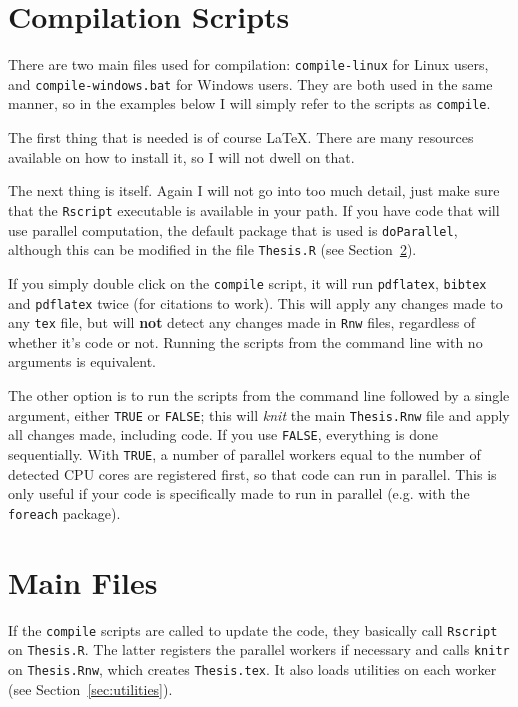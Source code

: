 \section{Compilation Scripts}
\label{sec:comp-scripts}

There are two main files used for compilation: \texttt{compile-linux} for Linux users, and \texttt{compile-windows.bat} for Windows users. They are both used in the same manner, so in the examples below I will simply refer to the scripts as \texttt{compile}.

The first thing that is needed is of course \LaTeX{}. There are many resources available on how to install it, so I will not dwell on that.

The next thing is \R{} itself. Again I will not go into too much detail, just make sure that the \texttt{Rscript} executable is available in your path. If you have code that will use parallel computation, the default \R{} package that is used is \texttt{doParallel}, although this can be modified in the file \texttt{Thesis.R} (see Section~\ref{sec:main-files}).

If you simply double click on the \texttt{compile} script, it will run \texttt{pdflatex}, \texttt{bibtex} and \texttt{pdflatex} twice (for citations to work). This will apply any changes made to any \texttt{tex} file, but will \textbf{not} detect any changes made in \texttt{Rnw} files, regardless of whether it's \R{} code or not. Running the scripts from the command line with no arguments is equivalent.

The other option is to run the scripts from the command line followed by a single argument, either \texttt{TRUE} or \texttt{FALSE}; this will \textit{knit} the main \texttt{Thesis.Rnw} file and apply all changes made, including \R{} code. If you use \texttt{FALSE}, everything is done sequentially. With \texttt{TRUE}, a number of parallel workers equal to the number of detected CPU cores are registered first, so that \R{} code can run in parallel. This is only useful if your code is specifically made to run in parallel (e.g. with the \texttt{foreach} package).

\section{Main Files}
\label{sec:main-files}

If the \texttt{compile} scripts are called to update the \R{} code, they basically call \texttt{Rscript} on \texttt{Thesis.R}. The latter registers the parallel workers if necessary and calls \texttt{knitr} on \texttt{Thesis.Rnw}, which creates \texttt{Thesis.tex}. It also loads \R{} utilities on each worker (see Section~\ref{sec:utilities}).

